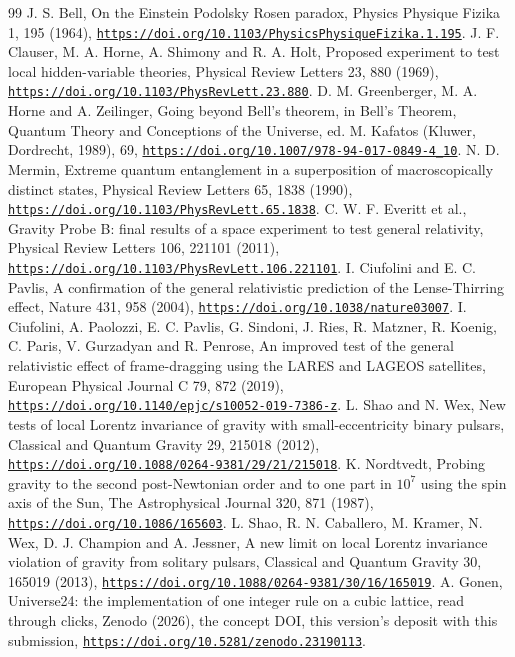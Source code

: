 \documentclass[pdflatex,sn-mathphys-num]{sn-jnl}
\theoremstyle{thmstyleone}
\theoremstyle{thmstyletwo}
\begin{document}
\begin{thebibliography}{99}
 J. S. Bell, On the Einstein Podolsky Rosen paradox, Physics Physique Fizika 1, 195 (1964), \href{https://doi.org/10.1103/PhysicsPhysiqueFizika.1.195}{\nolinkurl{https://doi.org/10.1103/PhysicsPhysiqueFizika.1.195}}.
 J. F. Clauser, M. A. Horne, A. Shimony and R. A. Holt, Proposed experiment to test local hidden-variable theories, Physical Review Letters 23, 880 (1969), \href{https://doi.org/10.1103/PhysRevLett.23.880}{\nolinkurl{https://doi.org/10.1103/PhysRevLett.23.880}}.
 D. M. Greenberger, M. A. Horne and A. Zeilinger, Going beyond Bell's theorem, in Bell's Theorem, Quantum Theory and Conceptions of the Universe, ed. M. Kafatos (Kluwer, Dordrecht, 1989), 69, \href{https://doi.org/10.1007/978-94-017-0849-4_10}{\nolinkurl{https://doi.org/10.1007/978-94-017-0849-4_10}}.
 N. D. Mermin, Extreme quantum entanglement in a superposition of macroscopically distinct states, Physical Review Letters 65, 1838 (1990), \href{https://doi.org/10.1103/PhysRevLett.65.1838}{\nolinkurl{https://doi.org/10.1103/PhysRevLett.65.1838}}.
 C. W. F. Everitt et al., Gravity Probe B: final results of a space experiment to test general relativity, Physical Review Letters 106, 221101 (2011), \href{https://doi.org/10.1103/PhysRevLett.106.221101}{\nolinkurl{https://doi.org/10.1103/PhysRevLett.106.221101}}.
 I. Ciufolini and E. C. Pavlis, A confirmation of the general relativistic prediction of the Lense-Thirring effect, Nature 431, 958 (2004), \href{https://doi.org/10.1038/nature03007}{\nolinkurl{https://doi.org/10.1038/nature03007}}.
 I. Ciufolini, A. Paolozzi, E. C. Pavlis, G. Sindoni, J. Ries, R. Matzner, R. Koenig, C. Paris, V. Gurzadyan and R. Penrose, An improved test of the general relativistic effect of frame-dragging using the LARES and LAGEOS satellites, European Physical Journal C 79, 872 (2019), \href{https://doi.org/10.1140/epjc/s10052-019-7386-z}{\nolinkurl{https://doi.org/10.1140/epjc/s10052-019-7386-z}}.
 L. Shao and N. Wex, New tests of local Lorentz invariance of gravity with small-eccentricity binary pulsars, Classical and Quantum Gravity 29, 215018 (2012), \href{https://doi.org/10.1088/0264-9381/29/21/215018}{\nolinkurl{https://doi.org/10.1088/0264-9381/29/21/215018}}.
 K. Nordtvedt, Probing gravity to the second post-Newtonian order and to one part in $10^7$ using the spin axis of the Sun, The Astrophysical Journal 320, 871 (1987), \href{https://doi.org/10.1086/165603}{\nolinkurl{https://doi.org/10.1086/165603}}.
 L. Shao, R. N. Caballero, M. Kramer, N. Wex, D. J. Champion and A. Jessner, A new limit on local Lorentz invariance violation of gravity from solitary pulsars, Classical and Quantum Gravity 30, 165019 (2013), \href{https://doi.org/10.1088/0264-9381/30/16/165019}{\nolinkurl{https://doi.org/10.1088/0264-9381/30/16/165019}}.
 A. Gonen, Universe24: the implementation of one integer rule on a cubic lattice, read through clicks, Zenodo (2026), the concept DOI, this version's deposit with this submission, \href{https://doi.org/10.5281/zenodo.23190113}{\nolinkurl{https://doi.org/10.5281/zenodo.23190113}}.
\enlargethispage{2\baselineskip}
\end{thebibliography}
\end{document}
